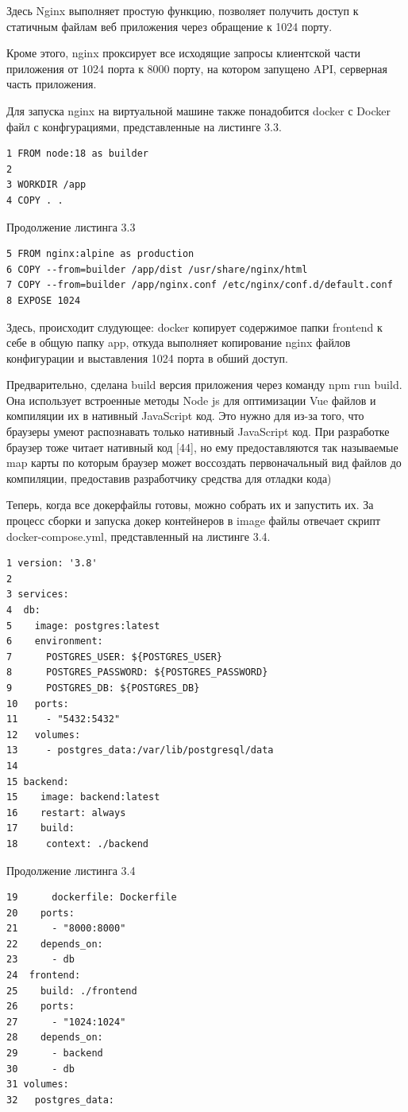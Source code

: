 \documentclass[a4paper,14pt,oneside]{extreport}
\begin{document}
Здесь Nginx выполняет простую функцию, позволяет получить доступ к статичным файлам веб приложения через обращение к 1024 порту.

Кроме этого, nginx проксирует все исходящие запросы клиентской части приложения от 1024 порта к 8000 порту, на котором запущено API, серверная часть приложения.

Для запуска nginx на виртуальной машине также понадобится docker с Docker файл с конфгурациями, представленные на листинге 3.3.

\begin{lstlisting}[caption=Dockerfile клиентской части]
1 FROM node:18 as builder
2
3 WORKDIR /app
4 COPY . .
\end{lstlisting}
\noindent Продолжение листинга 3.3
\vspace{13pt}
\begin{lstlisting}[captionpos=none, title={}]
5 FROM nginx:alpine as production
6 COPY --from=builder /app/dist /usr/share/nginx/html
7 COPY --from=builder /app/nginx.conf /etc/nginx/conf.d/default.conf
8 EXPOSE 1024
\end{lstlisting}

Здесь, происходит слудующее: docker копирует содержимое папки frontend к себе в общую папку app, откуда выполняет копирование nginx файлов конфигурации и выставления 1024 порта в обший доступ.


Предварительно, сделана build версия приложения через команду npm run build. Она использует встроенные методы Node js для оптимизации Vue файлов и компиляции их в нативный JavaScript код. Это нужно для из-за того, что браузеры умеют распознавать только нативный JavaScript код. При разработке браузер тоже читает нативный код [44], но ему предоставляются так называемые map карты по которым браузер может воссоздать первоначальный вид файлов до компиляции, предоставив разработчику средства для отладки кода)

Теперь, когда все докерфайлы готовы, можно собрать их и запустить их. 
За процесс сборки и запуска докер контейнеров в image файлы отвечает скрипт docker-compose.yml, представленный на листинге 3.4.

\begin{lstlisting}[caption=Скрипт docker-compose.yml]
1 version: '3.8'
2
3 services:
4  db:
5    image: postgres:latest
6    environment:
7      POSTGRES_USER: ${POSTGRES_USER}
8      POSTGRES_PASSWORD: ${POSTGRES_PASSWORD}
9      POSTGRES_DB: ${POSTGRES_DB}
10   ports:
11     - "5432:5432"
12   volumes:
13     - postgres_data:/var/lib/postgresql/data
14
15 backend:
15    image: backend:latest
16    restart: always
17    build:
18     context: ./backend
\end{lstlisting}
\noindent Продолжение листинга 3.4
\vspace{13pt}
\begin{lstlisting}[captionpos=none, title={}]
19      dockerfile: Dockerfile
20    ports:
21      - "8000:8000"
22    depends_on:
23      - db
24  frontend:
25    build: ./frontend
26    ports:
27      - "1024:1024"
28    depends_on:
29      - backend
30      - db
31 volumes:
32   postgres_data:
\end{lstlisting}
\end{document}

